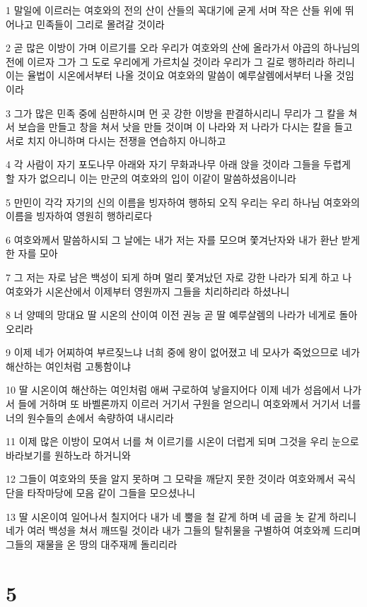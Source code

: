\par 1 말일에 이르러는 여호와의 전의 산이 산들의 꼭대기에 굳게 서며 작은 산들 위에 뛰어나고 민족들이 그리로 몰려갈 것이라
\par 2 곧 많은 이방이 가며 이르기를 오라 우리가 여호와의 산에 올라가서 야곱의 하나님의 전에 이르자 그가 그 도로 우리에게 가르치실 것이라 우리가 그 길로 행하리라 하리니 이는 율법이 시온에서부터 나올 것이요 여호와의 말씀이 예루살렘에서부터 나올 것임이라
\par 3 그가 많은 민족 중에 심판하시며 먼 곳 강한 이방을 판결하시리니 무리가 그 칼을 쳐서 보습을 만들고 창을 쳐서 낫을 만들 것이며 이 나라와 저 나라가 다시는 칼을 들고 서로 치지 아니하며 다시는 전쟁을 연습하지 아니하고
\par 4 각 사람이 자기 포도나무 아래와 자기 무화과나무 아래 앉을 것이라 그들을 두렵게 할 자가 없으리니 이는 만군의 여호와의 입이 이같이 말씀하셨음이니라
\par 5 만민이 각각 자기의 신의 이름을 빙자하여 행하되 오직 우리는 우리 하나님 여호와의 이름을 빙자하여 영원히 행하리로다
\par 6 여호와께서 말씀하시되 그 날에는 내가 저는 자를 모으며 쫓겨난자와 내가 환난 받게한 자를 모아
\par 7 그 저는 자로 남은 백성이 되게 하며 멀리 쫓겨났던 자로 강한 나라가 되게 하고 나 여호와가 시온산에서 이제부터 영원까지 그들을 치리하리라 하셨나니
\par 8 너 양떼의 망대요 딸 시온의 산이여 이전 권능 곧 딸 예루살렘의 나라가 네게로 돌아오리라
\par 9 이제 네가 어찌하여 부르짖느냐 너희 중에 왕이 없어졌고 네 모사가 죽었으므로 네가 해산하는 여인처럼 고통함이냐
\par 10 딸 시온이여 해산하는 여인처럼 애써 구로하여 낳을지어다 이제 네가 성읍에서 나가서 들에 거하며 또 바벨론까지 이르러 거기서 구원을 얻으리니 여호와께서 거기서 너를 너의 원수들의 손에서 속량하여 내시리라
\par 11 이제 많은 이방이 모여서 너를 쳐 이르기를 시온이 더럽게 되며 그것을 우리 눈으로 바라보기를 원하노라 하거니와
\par 12 그들이 여호와의 뜻을 알지 못하며 그 모략을 깨닫지 못한 것이라 여호와께서 곡식단을 타작마당에 모음 같이 그들을 모으셨나니
\par 13 딸 시온이여 일어나서 칠지어다 내가 네 뿔을 철 같게 하며 네 굽을 놋 같게 하리니 네가 여러 백성을 쳐서 깨뜨릴 것이라 내가 그들의 탈취물을 구별하여 여호와께 드리며 그들의 재물을 온 땅의 대주재께 돌리리라

\chapter{5}


